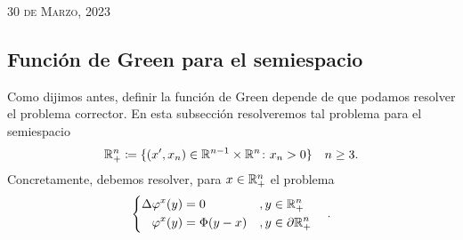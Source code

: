 \documentclass[../edp.tex]{subfiles}
\begin{document}
{\scshape \hfill 30 de Marzo, 2023}

\subsection{Función de Green para el semiespacio}

Como dijimos antes, definir la función de Green depende de que podamos resolver
el problema corrector. En esta subsección resolveremos tal problema para el
semiespacio
\begin{displaymath}
	\mathbb{R}^{n}_{+}
	\coloneqq
	\lbrace 
		(x', x_n) \in \mathbb{R}^{n-1}\times\mathbb{R}^n
		\colon
		x_n > 0
	\rbrace
	\quad
	n \ge 3.
\end{displaymath}
Concretamente, debemos resolver, para \(x\in\mathbb{R}^{n}_{+}\) el problema
\begin{displaymath}
\begin{cases}
\begin{aligned}
	\Delta \varphi^{x}(y) &= 0 &&, y\in \mathbb{R}^n_{+}\\
	\varphi^{x}(y) &= \Phi(y - x) &&, y \in \partial\mathbb{R}^{n}_{+}
\end{aligned}
\end{cases}.
\end{displaymath}
\end{document}
